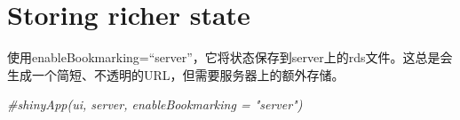\documentclass[
]{book}
\newenvironment{Shaded}{\begin{snugshade}}{\end{snugshade}}
\newcommand{\AttributeTok}[1]{\textcolor[rgb]{0.77,0.63,0.00}{#1}}
\newcommand{\CommentTok}[1]{\textcolor[rgb]{0.56,0.35,0.01}{\textit{#1}}}
\newcommand{\ConstantTok}[1]{\textcolor[rgb]{0.00,0.00,0.00}{#1}}
\newcommand{\DecValTok}[1]{\textcolor[rgb]{0.00,0.00,0.81}{#1}}
\newcommand{\FunctionTok}[1]{\textcolor[rgb]{0.00,0.00,0.00}{#1}}
\newcommand{\NormalTok}[1]{#1}
\newcommand{\OtherTok}[1]{\textcolor[rgb]{0.56,0.35,0.01}{#1}}
\newcommand{\SpecialCharTok}[1]{\textcolor[rgb]{0.00,0.00,0.00}{#1}}
\newcommand{\StringTok}[1]{\textcolor[rgb]{0.31,0.60,0.02}{#1}}
\begin{document}
\begin{Shaded}
\end{Shaded}

\hypertarget{storing-richer-state}{%
\section{Storing richer state}\label{storing-richer-state}}

使用enableBookmarking=``server''，它将状态保存到server上的rds文件。这总是会生成一个简短、不透明的URL，但需要服务器上的额外存储。

\begin{Shaded}
\begin{Highlighting}[]
\CommentTok{\#shinyApp(ui, server, enableBookmarking = "server")}
\end{Highlighting}
\end{Shaded}
\end{document}
